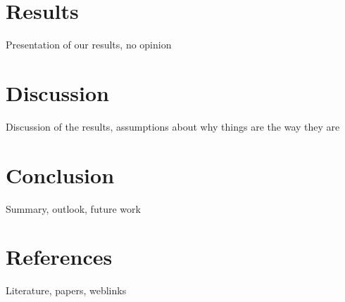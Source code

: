 \documentclass{article}
\begin{document}
\section{Results}
Presentation of our results, no opinion

\section{Discussion}
Discussion of the results, assumptions about why things are the way they are

\section{Conclusion}
Summary, outlook, future work

\section{References}
Literature, papers, weblinks
\printbibliography
\end{document}
